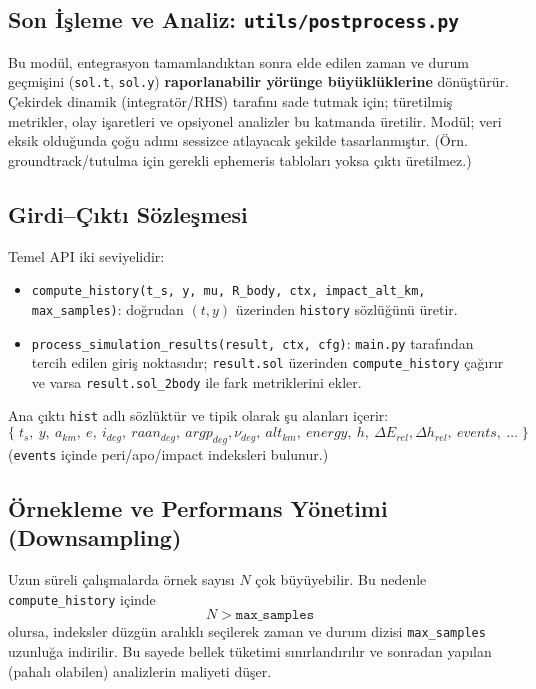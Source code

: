 \newpage
\subsection{Son İşleme ve Analiz: \texttt{utils/postprocess.py}}
\label{subsec:postprocess}

Bu modül, entegrasyon tamamlandıktan sonra elde edilen
zaman ve durum geçmişini (\texttt{sol.t}, \texttt{sol.y})
\textbf{raporlanabilir yörünge büyüklüklerine} dönüştürür.
Çekirdek dinamik (integratör/RHS) tarafını sade tutmak için;
türetilmiş metrikler, olay işaretleri ve opsiyonel analizler bu katmanda üretilir.  Modül; veri eksik olduğunda çoğu adımı sessizce atlayacak şekilde tasarlanmıştır. (Örn. groundtrack/tutulma için gerekli ephemeris tabloları yoksa çıktı üretilmez.) 

\subsection*{Girdi--Çıktı Sözleşmesi}

Temel API iki seviyelidir:

\begin{itemize}
  \item \texttt{compute\_history(t\_s, y, mu, R\_body, ctx, impact\_alt\_km, max\_samples)}:
  doğrudan $(t,y)$ üzerinden \texttt{history} sözlüğünü üretir.
  \item \texttt{process\_simulation\_results(result, ctx, cfg)}:
  \texttt{main.py} tarafından tercih edilen giriş noktasıdır; 
  \texttt{result.sol} üzerinden \texttt{compute\_history} çağırır ve varsa \newline \texttt{result.sol\_2body} ile fark metriklerini ekler.
\end{itemize}

Ana çıktı \texttt{hist} adlı sözlüktür ve tipik olarak şu alanları içerir:
\[
\{\; t_s,\ y,\ a_{km},\ e,\ i_{deg},\ raan_{deg},\ argp_{deg},\nu_{deg},\ alt_{km},\ energy,\ h,\ 
\Delta E_{rel},\Delta h_{rel},\ events,\ \ldots \;\}
\]
(\texttt{events} içinde peri/apo/impact indeksleri bulunur.) 

\subsection*{Örnekleme ve Performans Yönetimi (Downsampling)}

Uzun süreli çalışmalarda örnek sayısı $N$ çok büyüyebilir.
Bu nedenle \texttt{compute\_history} içinde
\[
N > \texttt{max\_samples}
\]
olursa, indeksler düzgün aralıklı seçilerek zaman ve durum dizisi
\texttt{max\_samples} uzunluğa indirilir.
Bu sayede bellek tüketimi sınırlandırılır ve sonradan yapılan
(pahalı olabilen) analizlerin maliyeti düşer. 


